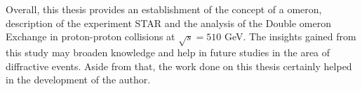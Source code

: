 \newline
Overall, this thesis provides an establishment of the concept of a \Pom omeron, description of the experiment STAR and the analysis of the Double \Pom omeron Exchange in proton-proton collisions at $\sqrt{s}=510$ GeV. The insights gained from this study may broaden knowledge and help in future studies in the area of diffractive events. Aside from that, the work done on this thesis certainly helped in the development of the author.